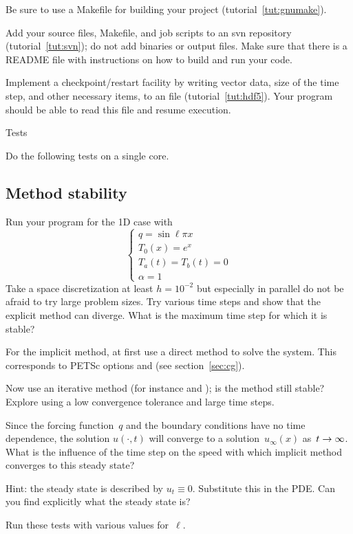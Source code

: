 Be sure to use a Makefile for building your project (tutorial~\ref{tut:gnumake}).

Add your source files, Makefile, and job scripts to an svn repository
(tutorial~\ref{tut:svn}); do not add binaries or output files. Make
sure that there is a README
file with instructions on how to build and run your code.

Implement a checkpoint/restart facility by writing vector data, size
of the time step, and other necessary items, to an  file
(tutorial~\ref{tut:hdf5}). Your program should be able to read this
file and resume execution.

 {Tests}

Do the following tests on a single core.

\subsection*{Method stability}

Run your program for the 1D case with 
\[
\begin{cases}
  q=\sin\ell\pi x\\ T_0(x)=e^x\\ T_a(t)=T_b(t)=0\\ \alpha=1
\end{cases}
\]
Take a space discretization at least $h=10^{-2}$ but especially in
parallel do not be afraid to try large problem sizes. Try various 
time steps
and show that
the explicit method can diverge. What is the maximum time step for
which it is stable? 

For the implicit method, at first use a direct method to solve the
system.
This corresponds to PETSc options  and  (see
section~\ref{sec:cg}).

Now use an iterative method (for instance  and );
is the method still stable? Explore using a low convergence tolerance
and large time steps. 

Since the forcing function~$q$ and the boundary conditions have no
time dependence, the solution $u(\cdot,t)$ will converge to a
 solution~$u_\infty(x)$
as~$t\rightarrow\nobreak\infty$. What is the influence of the time step on the
speed with which implicit method converges to this steady state?

Hint: the steady state is described by $u_t\equiv0$. Substitute this
in the \ac{PDE}. Can you find explicitly what the steady state is?

Run these tests with various values for~$\ell$.

